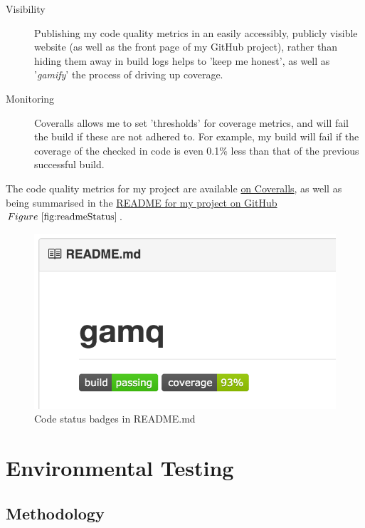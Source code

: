 \begin{description}
  \item[Visibility] Publishing my code quality metrics in an easily accessibly,
  publicly visible website (as well as the front page of my GitHub project),
  rather than hiding them away in build logs helps to 'keep me honest', as well
  as '\textit{\gls{gamify}}' the process of driving up coverage.
  \item[Monitoring] Coveralls allows me to set 'thresholds' for coverage
  metrics, and will fail the build if these are not adhered to. For example, my
  build will fail if the coverage of the checked in code is even 0.1\% less than
  that of the previous successful build.
\end{description}

The code quality metrics for my project are available
\href{https://coveralls.io/github/FireEater64/gamq?branch=master}{on Coveralls},
as well as being summarised in the
\href{https://github.com/FireEater64/gamq/blob/master/README.md}{README for my
project on GitHub}\(Figure~\ref{fig:readmeStatus} \).

\begin{figure}
  \includegraphics{figures/README}
  \centering
  \caption{Code status badges in README.md}
  \label{fig:readmeStatus}
\end{figure}

\section{Environmental Testing}
\label{sec:Environmental Testing}


\subsection{Methodology}
\label{sub:Methodology}

